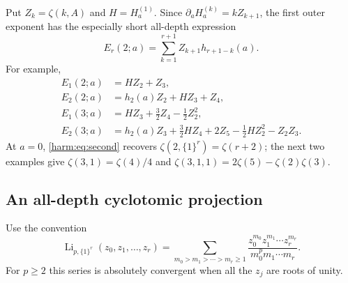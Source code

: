 \documentclass[11pt,letterpaper]{article}
\numberwithin{equation}{section}
\theoremstyle{plain}
\theoremstyle{definition}
\theoremstyle{remark}
\begin{document}
Put $Z_k=\zeta(k,A)$ and $H=H_a^{(1)}$.  Since
$\partial_a H_a^{(k)}=kZ_{k+1}$, the first outer exponent has the
especially short all-depth expression
\begin{equation}\label{harm:eq:second}
 E_r(2;a)=\sum_{k=1}^{r+1} Z_{k+1}h_{r+1-k}(a).
\end{equation}
For example,
\begin{align}
 E_1(2;a)&=HZ_2+Z_3,\label{harm:eq:examples1}\\
 E_2(2;a)&=h_2(a)Z_2+HZ_3+Z_4,\\
 E_1(3;a)&=HZ_3+\frac32Z_4-\frac12Z_2^2,\\
 E_2(3;a)&=h_2(a)Z_3+\frac32HZ_4+2Z_5
                   -\frac12HZ_2^2-Z_2Z_3.\label{harm:eq:examples4}
\end{align}
At $a=0$, \eqref{harm:eq:second} recovers
$\zeta(2,\{1\}^r)=\zeta(r+2)$; the next two examples give
$\zeta(3,1)=\zeta(4)/4$ and
$\zeta(3,1,1)=2\zeta(5)-\zeta(2)\zeta(3)$.

\subsection{An all-depth cyclotomic projection}

Use the convention
\[
 \operatorname{Li}_{p,\{1\}^r}(z_0,z_1,\ldots,z_r)
 =\sum_{m_0>m_1>\cdots>m_r\geq1}
   \frac{z_0^{m_0}z_1^{m_1}\cdots z_r^{m_r}}
        {m_0^p m_1\cdots m_r}.
\]
For $p\geq2$ this series is absolutely convergent when all the
$z_j$ are roots of unity.
\end{document}
